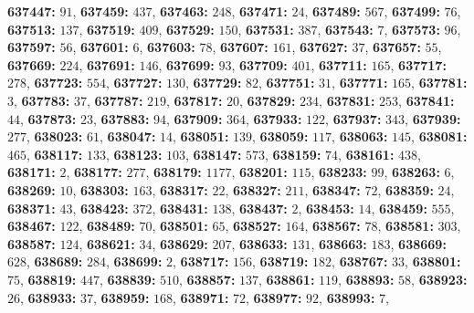 \textsf{\bfseries 637447:} $91$, \textsf{\bfseries 637459:} $437$, \textsf{\bfseries 637463:} $248$, \textsf{\bfseries 637471:} $24$, \textsf{\bfseries 637489:} $567$, \textsf{\bfseries 637499:} $76$, \textsf{\bfseries 637513:} $137$, \textsf{\bfseries 637519:} $409$, \textsf{\bfseries 637529:} $150$, \textsf{\bfseries 637531:} $387$, \textsf{\bfseries 637543:} $7$, \textsf{\bfseries 637573:} $96$, \textsf{\bfseries 637597:} $56$, \textsf{\bfseries 637601:} $6$, \textsf{\bfseries 637603:} $78$, \textsf{\bfseries 637607:} $161$, \textsf{\bfseries 637627:} $37$, \textsf{\bfseries 637657:} $55$, \textsf{\bfseries 637669:} $224$, \textsf{\bfseries 637691:} $146$, \textsf{\bfseries 637699:} $93$, \textsf{\bfseries 637709:} $401$, \textsf{\bfseries 637711:} $165$, \textsf{\bfseries 637717:} $278$, \textsf{\bfseries 637723:} $554$, \textsf{\bfseries 637727:} $130$, \textsf{\bfseries 637729:} $82$, \textsf{\bfseries 637751:} $31$, \textsf{\bfseries 637771:} $165$, \textsf{\bfseries 637781:} $3$, \textsf{\bfseries 637783:} $37$, \textsf{\bfseries 637787:} $219$, \textsf{\bfseries 637817:} $20$, \textsf{\bfseries 637829:} $234$, \textsf{\bfseries 637831:} $253$, \textsf{\bfseries 637841:} $44$, \textsf{\bfseries 637873:} $23$, \textsf{\bfseries 637883:} $94$, \textsf{\bfseries 637909:} $364$, \textsf{\bfseries 637933:} $122$, \textsf{\bfseries 637937:} $343$, \textsf{\bfseries 637939:} $277$, \textsf{\bfseries 638023:} $61$, \textsf{\bfseries 638047:} $14$, \textsf{\bfseries 638051:} $139$, \textsf{\bfseries 638059:} $117$, \textsf{\bfseries 638063:} $145$, \textsf{\bfseries 638081:} $465$, \textsf{\bfseries 638117:} $133$, \textsf{\bfseries 638123:} $103$, \textsf{\bfseries 638147:} $573$, \textsf{\bfseries 638159:} $74$, \textsf{\bfseries 638161:} $438$, \textsf{\bfseries 638171:} $2$, \textsf{\bfseries 638177:} $277$, \textsf{\bfseries 638179:} $1177$, \textsf{\bfseries 638201:} $115$, \textsf{\bfseries 638233:} $99$, \textsf{\bfseries 638263:} $6$, \textsf{\bfseries 638269:} $10$, \textsf{\bfseries 638303:} $163$, \textsf{\bfseries 638317:} $22$, \textsf{\bfseries 638327:} $211$, \textsf{\bfseries 638347:} $72$, \textsf{\bfseries 638359:} $24$, \textsf{\bfseries 638371:} $43$, \textsf{\bfseries 638423:} $372$, \textsf{\bfseries 638431:} $138$, \textsf{\bfseries 638437:} $2$, \textsf{\bfseries 638453:} $14$, \textsf{\bfseries 638459:} $555$, \textsf{\bfseries 638467:} $122$, \textsf{\bfseries 638489:} $70$, \textsf{\bfseries 638501:} $65$, \textsf{\bfseries 638527:} $164$, \textsf{\bfseries 638567:} $78$, \textsf{\bfseries 638581:} $303$, \textsf{\bfseries 638587:} $124$, \textsf{\bfseries 638621:} $34$, \textsf{\bfseries 638629:} $207$, \textsf{\bfseries 638633:} $131$, \textsf{\bfseries 638663:} $183$, \textsf{\bfseries 638669:} $628$, \textsf{\bfseries 638689:} $284$, \textsf{\bfseries 638699:} $2$, \textsf{\bfseries 638717:} $156$, \textsf{\bfseries 638719:} $182$, \textsf{\bfseries 638767:} $33$, \textsf{\bfseries 638801:} $75$, \textsf{\bfseries 638819:} $447$, \textsf{\bfseries 638839:} $510$, \textsf{\bfseries 638857:} $137$, \textsf{\bfseries 638861:} $119$, \textsf{\bfseries 638893:} $58$, \textsf{\bfseries 638923:} $26$, \textsf{\bfseries 638933:} $37$, \textsf{\bfseries 638959:} $168$, \textsf{\bfseries 638971:} $72$, \textsf{\bfseries 638977:} $92$, \textsf{\bfseries 638993:} $7$, 
